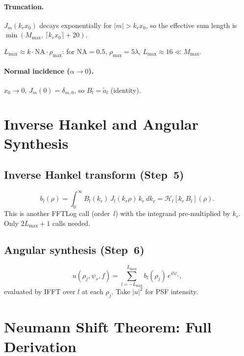 \documentclass[11pt,a4paper]{article}
\newcommand{\HT}{\mathcal{H}}
\begin{document}
\paragraph{Truncation.}
$J_m(k_r x_0)$ decays exponentially for $|m| > k_r x_0$, so the effective
sum length is $\min(M_{\max},\,\lceil k_r x_0\rceil + 20)$.

$L_{\max} \approx k\cdot\mathrm{NA}\cdot\rho_{\max}$: for NA${}=0.5$,
$\rho_{\max}=5\lambda$, $L_{\max}\approx 16 \ll M_{\max}$.

\paragraph{Normal incidence ($\alpha\to 0$).}
$x_0\to 0$, $J_m(0) = \delta_{m,0}$, so $B_l = \tilde a_l$ (identity).


\section{Inverse Hankel and Angular Synthesis}

\subsection{Inverse Hankel transform (Step~5)}

\begin{equation}\label{eq:bl}
  b_l(\rho) = \int_0^\infty B_l(k_r)\,J_l(k_r\rho)\,k_r\,dk_r
  = \HT_l[k_r\,B_l](\rho).
\end{equation}
This is another FFTLog call (order~$l$) with the integrand pre-multiplied by $k_r$.
Only $2L_{\max}+1$ calls needed.

\subsection{Angular synthesis (Step~6)}

\begin{equation}\label{eq:psf}
  u(\rho_j,\psi_s,f) = \sum_{l=-L_{\max}}^{L_{\max}} b_l(\rho_j)\,e^{il\psi_s},
\end{equation}
evaluated by IFFT over $l$ at each $\rho_j$.  Take $|u|^2$ for PSF intensity.


\section{Neumann Shift Theorem: Full Derivation}
\label{sec:neumann}
\end{document}

